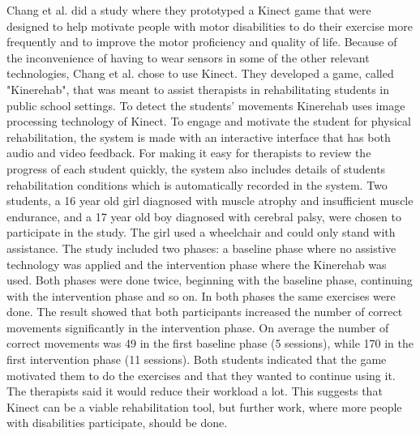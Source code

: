 Chang et al. did a study where they prototyped a Kinect game that were designed to help motivate people with motor disabilities to do their exercise more frequently and to improve the motor proficiency and quality of life. Because of the inconvenience of having to wear sensors in some of the other relevant technologies, Chang et al. chose to use Kinect. They developed a game, called "Kinerehab", that was meant to assist therapists in rehabilitating students in public school settings. To detect the students’ movements Kinerehab uses image processing technology of Kinect. To engage and motivate the student for physical rehabilitation, the system is made with an interactive interface that has both audio and video feedback. For making it easy for therapists to review the progress of each student quickly, the system also includes details of students rehabilitation conditions which is automatically recorded in the system. Two students, a 16 year old girl diagnosed with  muscle atrophy and insufficient muscle endurance, and a 17 year old boy diagnosed with cerebral palsy, were chosen to participate in the study. The girl used a wheelchair and could only stand with assistance. The study included two phases: a baseline phase  where no assistive technology was applied and the intervention phase where the Kinerehab was used. Both phases were done twice, beginning with the baseline phase, continuing with the intervention phase and so on. In both phases the same exercises were done. The result showed that both participants increased the number of correct movements significantly in the intervention phase. On average the number of correct movements was 49 in the first baseline phase (5 sessions), while 170 in the first intervention phase (11 sessions). Both students indicated that the game motivated them to do the exercises and that they wanted to continue using it. The therapists said it would reduce their workload a lot. This suggests that Kinect can be a viable rehabilitation tool, but further work, where more people with disabilities participate, should be done. \cite{kinect} \\ \\ 
